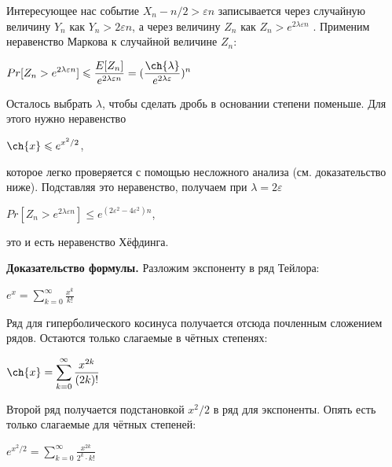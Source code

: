 \documentclass[a4paper, 10pt]{article}
\begin{document}
Интересующее нас событие $X_n - n/2 > \varepsilon n$ записывается через случайную величину $Y_n$ как $Y_n > 2\varepsilon n$, а через величину $Z_n$ как $Z_n > e^{2 \lambda \varepsilon n}$ .
Применим неравенство Маркова к случайной величине $Z_n$:

\begin{center}
	$\displaystyle Pr[Z_n > e^{2 \lambda \varepsilon n}] \leqslant \frac{E[Z_n]}{e^{2 \lambda \varepsilon n}} = (\frac{\ch{\lambda}}{e^{2 \lambda \varepsilon}})^n$
\end{center}

Осталось выбрать $\lambda$, чтобы сделать дробь в основании степени поменьше. Для этого нужно неравенство

\begin{center}
	$\displaystyle \ch{x} \leqslant e^{x^2 / 2}$,
\end{center}

которое легко проверяется с помощью несложного анализа (см. доказательство ниже). Подставляя это неравенство, получаем при $\lambda = 2\varepsilon$

\begin{center}
	$\displaystyle Pr[Z_n > e^{2 \lambda \varepsilon n}] \leqslant e^{(2 \varepsilon^2 - 4 \varepsilon^2)n}$,
\end{center}

это и есть неравенство Хёфдинга.

\medskip


\textbf{Доказательство формулы.} Разложим экспоненту в ряд Тейлора:

\begin{center}
	$\displaystyle e^x = \sum_{k = 0}^{\infty} \frac{x^k}{k!} $
\end{center}

Ряд для гиперболического косинуса получается отсюда почленным сложением рядов. Остаются только слагаемые в чётных степенях:

\begin{center}
	$\displaystyle \ch{x} = \sum_{k = 0}^{\infty} \frac{x^{2k}}{(2k)!}$
\end{center}

Второй ряд получается подстановкой $x^2 / 2$ в ряд для экспоненты. Опять есть только слагаемые для чётных степеней:

\begin{center}
	$\displaystyle e^{x^2 / 2} = \sum_{k = 0}^{\infty} \frac{x^{2k}}{2^k \cdot k!}$
\end{center}
\end{document}
